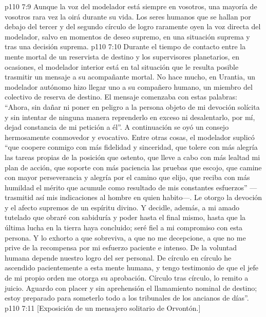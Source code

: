 \vs p110 7:9 Aunque la voz del modelador está siempre en vosotros, una mayoría de vosotros rara vez la oirá durante su vida. Los seres humanos que se hallan por debajo del tercer y del segundo círculo de logro raramente oyen la voz directa del modelador, salvo en momentos de deseo supremo, en una situación suprema y tras una decisión suprema.
\vs p110 7:10 \pc Durante el tiempo de contacto entre la mente mortal de un reservista de destino y los supervisores planetarios, en ocasiones, el modelador interior está en tal situación que le resulta posible trasmitir un mensaje a su acompañante mortal. No hace mucho, en Urantia, un modelador autónomo hizo llegar uno a su compañero humano, un miembro del colectivo de reserva de destino. El mensaje comenzaba con estas palabras: “Ahora, sin dañar ni poner en peligro a la persona objeto de mi devoción solícita y sin intentar de ninguna manera reprenderlo en exceso ni desalentarlo, por mí, dejad constancia de mi petición a él”. A continuación se oyó un consejo hermosamente conmovedor y evocativo. Entre otras cosas, el modelador suplicó “que coopere conmigo con más fidelidad y sinceridad, que tolere con más alegría las tareas propias de la posición que ostento, que lleve a cabo con más lealtad mi plan de acción, que soporte con más paciencia las pruebas que escojo, que camine con mayor perseverancia y alegría por el camino que elijo, que reciba con más humildad el mérito que acumule como resultado de mis constantes esfuerzos” ---trasmitid así mis indicaciones al hombre en quien habito---. Le otorgo la devoción y el afecto supremos de un espíritu divino. Y decidle, además, a mi amado tutelado que obraré con sabiduría y poder hasta el final mismo, hasta que la última lucha en la tierra haya concluido; seré fiel a mi compromiso con esta persona. Y lo exhorto a que sobreviva, a que no me decepcione, a que no me prive de la recompensa por mi esfuerzo paciente e intenso. De la voluntad humana depende nuestro logro del ser personal. De círculo en círculo he ascendido pacientemente a esta mente humana, y tengo testimonio de que el jefe de mi propio orden me otorga su aprobación. Círculo tras círculo, lo remito a juicio. Aguardo con placer y sin aprehensión el llamamiento nominal de destino; estoy preparado para someterlo todo a los tribunales de los ancianos de días”.
\vsetoff
\vs p110 7:11 [Exposición de un mensajero solitario de Orvontón.]
